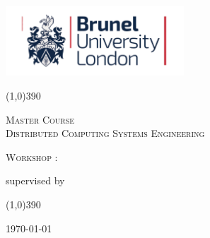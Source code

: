 \begin{titlepage}
	\flushright
	\includegraphics[width=0.50\textwidth]{res/Brunel_University_Logo.png}\par
	\centering
	\line(1,0){390}\\
	\vfill
	{\scshape\Large Master Course \\
	Distributed Computing Systems Engineering \par}
	\vspace{2cm}
	{\scshape\LARGE Workshop \courseNumber: \par}
	{\huge\bfseries \assignmentName\par}
	\vspace{2cm}
	{\Large\itshape \assignmentAuthor\par}

	{\Large\itshape \studentNumber \par}
	\vspace{1.5cm}
	supervised by\par
	\prof

	\vfill
	\line(1,0){390}
	\flushleft
	{\large \today\par}
\end{titlepage}